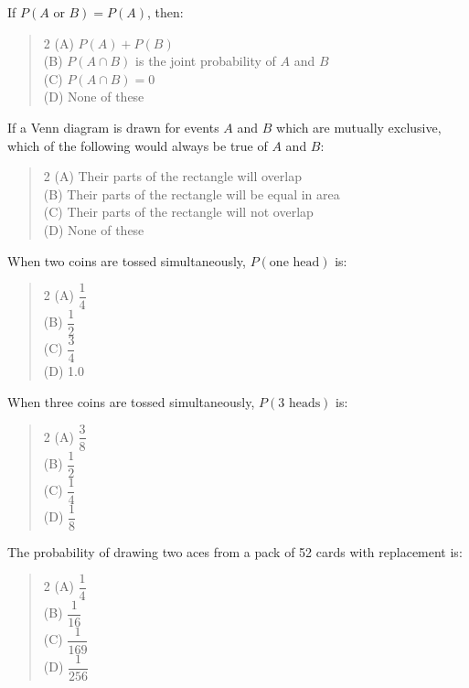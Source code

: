 \documentclass[11pt,a4paper]{article}
\begin{document}
\begin{mcqlist}
\item If $P(A \text{ or } B)=P(A)$, then:
\begin{quote}\begin{multicols}{2}
\noindent (A) $P(A)+P(B)$ \\
(B) $P(A\cap B)$ is the joint probability of $A$ and $B$ \\
(C) $P(A\cap B)=0$ \\
(D) None of these
\end{multicols}\end{quote}

\item If a Venn diagram is drawn for events $A$ and $B$ which are mutually exclusive, which of the following would always be true of $A$ and $B$:
\begin{quote}\begin{multicols}{2}
\noindent (A) Their parts of the rectangle will overlap \\
(B) Their parts of the rectangle will be equal in area \\
(C) Their parts of the rectangle will not overlap \\
(D) None of these
\end{multicols}\end{quote}

\item When two coins are tossed simultaneously, $P(\text{one head})$ is:
\begin{quote}\begin{multicols}{2}
\noindent (A) $\dfrac{1}{4}$ \\
(B) $\dfrac{1}{2}$ \\
(C) $\dfrac{3}{4}$ \\
(D) 1.0
\end{multicols}\end{quote}

\item When three coins are tossed simultaneously, $P(3\text{ heads})$ is:
\begin{quote}\begin{multicols}{2}
\noindent (A) $\dfrac{3}{8}$ \\
(B) $\dfrac{1}{2}$ \\
(C) $\dfrac{1}{4}$ \\
(D) $\dfrac{1}{8}$
\end{multicols}\end{quote}

\item The probability of drawing two aces from a pack of 52 cards with replacement is:
\begin{quote}\begin{multicols}{2}
\noindent (A) $\dfrac{1}{4}$ \\
(B) $\dfrac{1}{16}$ \\
(C) $\dfrac{1}{169}$ \\
(D) $\dfrac{1}{256}$
\end{multicols}\end{quote}


\end{mcqlist}
\end{document}
